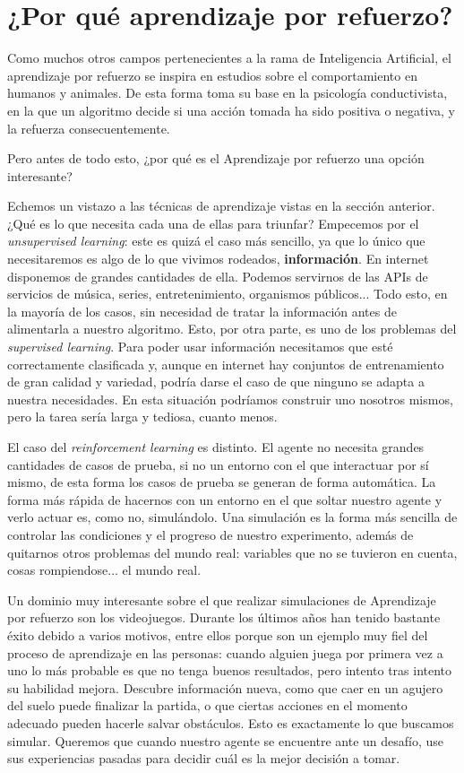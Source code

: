 \section{¿Por qué aprendizaje por refuerzo?}
Como muchos otros campos pertenecientes a la rama de Inteligencia Artificial, el aprendizaje por refuerzo se inspira en estudios sobre el comportamiento en humanos y animales. De esta forma toma su base en la psicología conductivista, en la que un algoritmo decide si una acción tomada ha sido positiva o negativa, y la refuerza consecuentemente.

Pero antes de todo esto, ¿por qué es el Aprendizaje por refuerzo una opción interesante?

Echemos un vistazo a las técnicas de aprendizaje vistas en la sección anterior. ¿Qué es lo que necesita cada una de ellas para triunfar? Empecemos por el \textit{unsupervised learning}: este es quizá el caso más sencillo, ya que lo único que necesitaremos es algo de lo que vivimos rodeados, \textbf{información}. En internet disponemos de grandes cantidades de ella. Podemos servirnos de las APIs de servicios de música, series, entretenimiento, organismos públicos... Todo esto, en la mayoría de los casos, sin necesidad de tratar la información antes de alimentarla a nuestro algoritmo. Esto, por otra parte, es uno de los problemas del \textit{supervised learning}. Para poder usar información necesitamos que esté correctamente clasificada y, aunque en internet hay conjuntos de entrenamiento de gran calidad y variedad, podría darse el caso de que ninguno se adapta a nuestra necesidades. En esta situación podríamos construir uno nosotros mismos, pero la tarea sería larga y tediosa, cuanto menos.

El caso del \textit{reinforcement learning} es distinto. El agente no necesita grandes cantidades de casos de prueba, si no un entorno con el que interactuar por sí mismo, de esta forma los casos de prueba se generan de forma automática. La forma más rápida de hacernos con un entorno en el que soltar nuestro agente y verlo actuar es, como no, simulándolo. Una simulación es la forma más sencilla de controlar las condiciones y el progreso de nuestro experimento, además de quitarnos otros problemas del mundo real: variables que no se tuvieron en cuenta, cosas rompiendose... el mundo real.

Un dominio muy interesante sobre el que realizar simulaciones de Aprendizaje por refuerzo son los videojuegos. Durante los últimos años han tenido bastante éxito debido a varios motivos, entre ellos porque son un ejemplo muy fiel del proceso de aprendizaje en las personas: cuando alguien juega por primera vez a uno lo más probable es que no tenga buenos resultados, pero intento tras intento su habilidad mejora. Descubre información nueva, como que caer en un agujero del suelo puede finalizar la partida, o que ciertas acciones en el momento adecuado pueden hacerle salvar obstáculos. Esto es exactamente lo que buscamos simular. Queremos que cuando nuestro agente se encuentre ante un desafío, use sus experiencias pasadas para decidir cuál es la mejor decisión a tomar.

